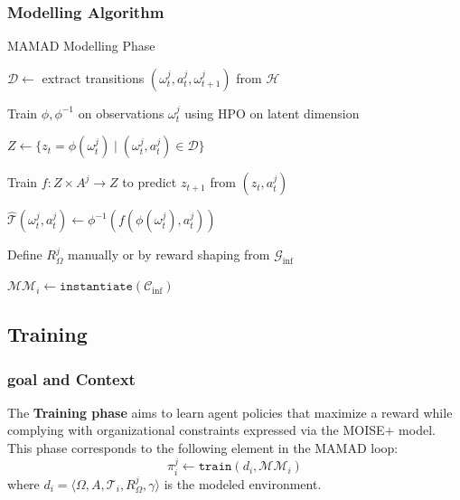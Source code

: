 \documentclass[pdflatex,sn-mathphys-num]{sn-jnl}%
\theoremstyle{thmstyleone}%
\theoremstyle{thmstyletwo}%
\theoremstyle{thmstylethree}%
\begin{document}
\subsubsection*{Modelling Algorithm}

\begin{algorithm}[H]
    \caption{MAMAD Modelling Phase}
    \label{alg:modelling}
    \DontPrintSemicolon
    
    $\mathcal{D} \gets$ extract transitions $(\omega^j_t, a^j_t, \omega^j_{t+1})$ from $\mathcal{H}$
    
    Train $\phi, \phi^{-1}$ on observations $\omega^j_t$ using HPO on latent dimension
    
    $Z \gets \{ z_t = \phi(\omega^j_t) \mid (\omega^j_t, a^j_t) \in \mathcal{D} \}$
    
    Train $f: Z \times A^j \rightarrow Z$ to predict $z_{t+1}$ from $(z_t, a^j_t)$
    
    $\hat{\mathcal{T}}(\omega^j_t, a^j_t) \gets \phi^{-1}(f(\phi(\omega^j_t), a^j_t))$
    
    Define $R^j_\Omega$ manually or by reward shaping from $\mathcal{G}_{\text{inf}}$
    
    $\mathcal{MM}_i \gets \texttt{instantiate}(\mathcal{C}_{\text{inf}})$
\end{algorithm}


\subsection{Training}\label{sec:training}

\subsubsection*{goal and Context}

The \textbf{Training phase} aims to learn agent policies that maximize a reward while complying with organizational constraints expressed via the MOISE+ model. This phase corresponds to the following element in the MAMAD loop:
\[
    \pi^j_i \gets \texttt{train}(d_i, \mathcal{MM}_i)
\]
where \( d_i = \langle \Omega, A, \mathcal{T}_i, R^j_\Omega, \gamma \rangle \) is the modeled environment.
\end{document}
